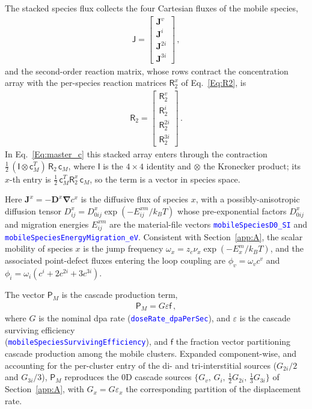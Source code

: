\documentclass{article}
\newcommand{\textttclr}[1]{\textcolor{blue}{\texttt{#1}}}
\newcommand{\spvec}[1]{\bm{\mathsf{#1}}}   %
\newcommand{\spmat}[1]{\bm{\mathsf{#1}}}   %
\begin{document}
The stacked species flux collects the four Cartesian fluxes of the mobile species,
\begin{align}\label{eq:Jdef}
\spvec{J}=\begin{bmatrix}
 \bm{J}^v \\
 \bm{J}^i \\
 \bm{J}^{2i} \\
 \bm{J}^{3i}
\end{bmatrix}\, ,
\end{align}
and the second-order reaction matrix, whose rows contract the concentration array with the per-species reaction matrices $\spmat{R}_2^x$ of Eq.~\eqref{Eq:R2}, is
\begin{align}\label{eq:R2def}
\spmat{R}_2=\begin{bmatrix}
\spmat{R}_{2}^{v} \\
\spmat{R}_{2}^{i} \\
\spmat{R}_{2}^{2i} \\
\spmat{R}_{2}^{3i}
\end{bmatrix}\, .
\end{align}
In Eq.~\eqref{Eq:master_c} this stacked array enters through the contraction $\tfrac{1}{2}\,(\spmat{I}\otimes\spvec{c}_M^T)\,\spmat{R}_2\,\spvec{c}_{M}$, where $\spmat{I}$ is the $4\times4$ identity and $\otimes$ the Kronecker product; its $x$-th entry is $\tfrac{1}{2}\,\spvec{c}_M^T\spmat{R}_2^{x}\,\spvec{c}_{M}$, so the term is a vector in species space.

Here $\bm J^x =-\bm D^x\bm\nabla c^x$ is the diffusive flux of species $x$, with a possibly-anisotropic diffusion tensor $D^x_{ij}=D^x_{0ij}\exp(-E^{xm}_{ij}/k_BT)$ whose pre-exponential factors $D^x_{0ij}$ and migration energies $E^{xm}_{ij}$ are the material-file vectors \textttclr{mobileSpeciesD0\_SI} and \textttclr{mobileSpeciesEnergyMigration\_eV}. Consistent with Section~\ref{app:A}, the scalar mobility of species $x$ is the jump frequency $\omega_x=z_c\nu_x\exp(-E_x^m/k_BT)$, and the associated point-defect fluxes entering the loop coupling are $\phi_v=\omega_v c^v$ and $\phi_i=\omega_i(c^i+2c^{2i}+3c^{3i})$.

The vector $\spvec{P}_M$ is the cascade production term,
\begin{align}\label{Eq:PGM}
   \spvec{P}_{M} =    G \varepsilon \spvec{f}\,,
\end{align}
where $G$ is the nominal dpa rate (\textttclr{doseRate\_dpaPerSec}), and $\varepsilon$ is the cascade surviving efficiency\\ (\textttclr{mobileSpeciesSurvivingEfficiency}), and $\spvec{f}$ the fraction vector partitioning cascade production among the mobile clusters. Expanded component-wise, and accounting for the per-cluster entry of the di- and tri-interstitial sources ($G_{2i}/2$ and $G_{3i}/3$), $\spvec{P}_M$ reproduces the $0$D cascade sources $\{G_v,\,G_i,\,\tfrac12 G_{2i},\,\tfrac13 G_{3i}\}$ of Section~\ref{app:A}, with $G_x=G\varepsilon_x$ the corresponding partition of the displacement rate.
\end{document}
